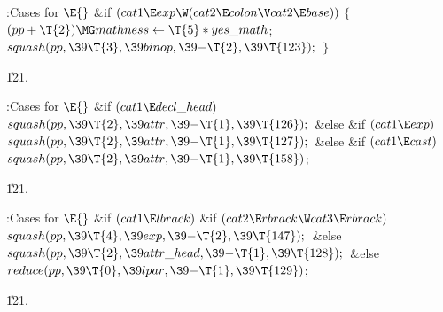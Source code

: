 \B{}:Cases for \X${}\E{}$\6
\&{if} ${}(\\{cat1}\E\\{exp}\W(\\{cat2}\E\\{colon}\V\\{cat2}\E\\{base})){}$\5
${}\{{}$\1\6
${}(\\{pp}+\T{2})\MG\\{mathness}\K\T{5}*\\{yes\_math}{}$;\6
${}\\{squash}(\\{pp},\39\T{3},\39\\{binop},\39{-}\T{2},\39\T{123});{}$\6
\4${}\}{}$\2\par
\U121.\fi

\B{}:Cases for \X${}\E{}$\6
\&{if} ${}(\\{cat1}\E\\{decl\_head}){}$\1\5
${}\\{squash}(\\{pp},\39\T{2},\39\\{attr},\39{-}\T{1},\39\T{126});{}$\2\6
\&{else} \&{if} ${}(\\{cat1}\E\\{exp}){}$\1\5
${}\\{squash}(\\{pp},\39\T{2},\39\\{attr},\39{-}\T{1},\39\T{127});{}$\2\6
\&{else} \&{if} ${}(\\{cat1}\E\\{cast}){}$\1\5
${}\\{squash}(\\{pp},\39\T{2},\39\\{attr},\39{-}\T{1},\39\T{158}){}$;\2\par
\U121.\fi

\B{}:Cases for \X${}\E{}$\6
\&{if} ${}(\\{cat1}\E\\{lbrack}){}$\1\6
\&{if} ${}(\\{cat2}\E\\{rbrack}\W\\{cat3}\E\\{rbrack}){}$\1\5
${}\\{squash}(\\{pp},\39\T{4},\39\\{exp},\39{-}\T{2},\39\T{147});{}$\2\6
\&{else}\1\5
${}\\{squash}(\\{pp},\39\T{2},\39\\{attr\_head},\39{-}\T{1},\39\T{128});{}$\2\2%
\6
\&{else}\1\5
${}\\{reduce}(\\{pp},\39\T{0},\39\\{lpar},\39{-}\T{1},\39\T{129}){}$;\2\par
\U121.\fi

